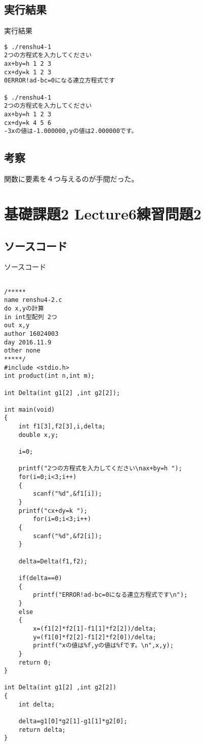 \documentclass[a4j,titlepage]{jarticle}
\begin{document}
\subsection{実行結果}
\begin{itembox}[l]{実行結果}
\begin{verbatim}
$ ./renshu4-1
2つの方程式を入力してください
ax+by=h 1 2 3
cx+dy=k 1 2 3
0ERROR!ad-bc=0になる連立方程式です

$ ./renshu4-1
2つの方程式を入力してください
ax+by=h 1 2 3
cx+dy=k 4 5 6
-3xの値は-1.000000,yの値は2.000000です。
\end{verbatim}
\end{itembox}

\subsection{考察}
関数に要素を４つ与えるのが手間だった。

\section{基礎課題2 Lecture6練習問題2}
\subsection{ソースコード}
\begin{breakitembox}[l]{ソースコード}
\begin{verbatim}

/*****
name renshu4-2.c
do x,yの計算
in int型配列 2つ
out x,y
author 16024003
day 2016.11.9
other none 
*****/
#include <stdio.h>
int product(int n,int m);

int Delta(int g1[2] ,int g2[2]);

int main(void)
{
    int f1[3],f2[3],i,delta;
    double x,y;

    i=0;

    printf("2つの方程式を入力してください\nax+by=h ");
    for(i=0;i<3;i++)
    {
        scanf("%d",&f1[i]);
    }
    printf("cx+dy=k ");
        for(i=0;i<3;i++)
    {
        scanf("%d",&f2[i]);
    }

    delta=Delta(f1,f2);

    if(delta==0)
    {
        printf("ERROR!ad-bc=0になる連立方程式です\n");
    }
    else 
    {
        x=(f1[2]*f2[1]-f1[1]*f2[2])/delta;
        y=(f1[0]*f2[2]-f1[2]*f2[0])/delta;
        printf("xの値は%f,yの値は%fです。\n",x,y);
    }
    return 0;
}

int Delta(int g1[2] ,int g2[2])
{
    int delta;

    delta=g1[0]*g2[1]-g1[1]*g2[0];
    return delta;
}
\end{verbatim}
\end{breakitembox}
\end{document}
